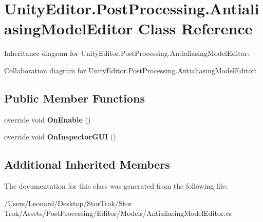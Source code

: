 \hypertarget{class_unity_editor_1_1_post_processing_1_1_antialiasing_model_editor}{}\section{Unity\+Editor.\+Post\+Processing.\+Antialiasing\+Model\+Editor Class Reference}
\label{class_unity_editor_1_1_post_processing_1_1_antialiasing_model_editor}


Inheritance diagram for Unity\+Editor.\+Post\+Processing.\+Antialiasing\+Model\+Editor\+:


Collaboration diagram for Unity\+Editor.\+Post\+Processing.\+Antialiasing\+Model\+Editor\+:
\subsection*{Public Member Functions}
\begin{DoxyCompactItemize}
\item 
\mbox{\label{class_unity_editor_1_1_post_processing_1_1_antialiasing_model_editor_a197f83799bb72c6f98ac55c058daa2d0}} 
override void {\bfseries On\+Enable} ()
\item 
\mbox{\label{class_unity_editor_1_1_post_processing_1_1_antialiasing_model_editor_a6309384162ac175322d6dcc44d0c2e0d}} 
override void {\bfseries On\+Inspector\+G\+UI} ()
\end{DoxyCompactItemize}
\subsection*{Additional Inherited Members}


The documentation for this class was generated from the following file\+:\begin{DoxyCompactItemize}
\item 
/\+Users/\+Leonard/\+Desktop/\+Stor\+Trok/\+Stor Trok/\+Assets/\+Post\+Processing/\+Editor/\+Models/Antialiasing\+Model\+Editor.\+cs\end{DoxyCompactItemize}
